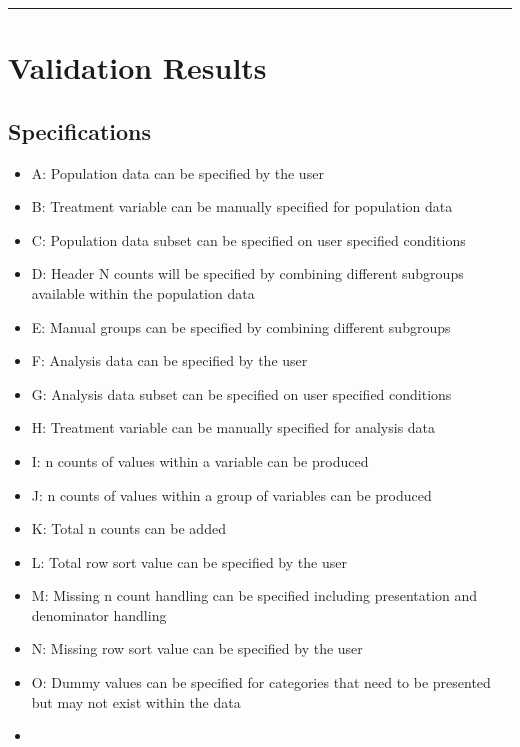 \documentclass[
]{article}
\providecommand{\tightlist}{%
  \setlength{\itemsep}{0pt}\setlength{\parskip}{0pt}}
\begin{document}
\begin{center}\rule{0.5\linewidth}{0.5pt}\end{center}

\hypertarget{validation-results}{%
\section{Validation Results}\label{validation-results}}

\hypertarget{specifications-1}{%
\subsection{Specifications}\label{specifications-1}}

\begin{itemize}
\tightlist
\item
  A: Population data can be specified by the user
\item
  B: Treatment variable can be manually specified for population data
\item
  C: Population data subset can be specified on user specified
  conditions
\item
  D: Header N counts will be specified by combining different subgroups
  available within the population data
\item
  E: Manual groups can be specified by combining different subgroups
\item
  F: Analysis data can be specified by the user
\item
  G: Analysis data subset can be specified on user specified conditions
\item
  H: Treatment variable can be manually specified for analysis data
\item
  I: n counts of values within a variable can be produced
\item
  J: n counts of values within a group of variables can be produced
\item
  K: Total n counts can be added
\item
  L: Total row sort value can be specified by the user
\item
  M: Missing n count handling can be specified including presentation
  and denominator handling
\item
  N: Missing row sort value can be specified by the user
\item
  O: Dummy values can be specified for categories that need to be
  presented but may not exist within the data
\item

\end{itemize}
\end{document}
